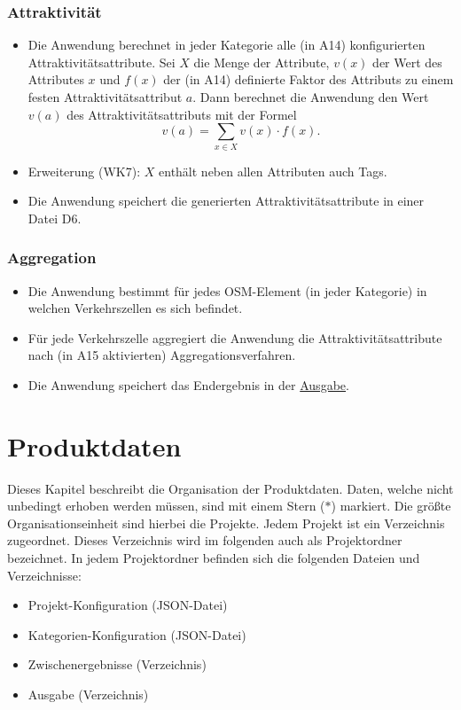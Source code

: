 \documentclass[parskip=full]{scrartcl} %
\begin{document}
\subsubsection*{Attraktivität}
\begin{itemize}
    \item Die Anwendung berechnet in jeder Kategorie alle (in A14) konfigurierten Attraktivitätsattribute. Sei $X$ die Menge der Attribute, $v(x)$ der Wert des Attributes $x$ und $f(x)$ der (in A14) definierte Faktor des Attributs zu einem festen Attraktivitätsattribut $a$. Dann berechnet die Anwendung den Wert $v(a)$ des Attraktivitätsattributs mit der Formel $$v(a)=\sum_{x\in X}{v(x)\cdot f(x)}.$$
    \item Erweiterung (WK7): $X$ enthält neben allen Attributen auch Tags.
    \item Die Anwendung speichert die generierten Attraktivitätsattribute in einer Datei D6.
\end{itemize}

\subsubsection*{Aggregation}
\begin{itemize}
    \item Die Anwendung bestimmt für jedes OSM-Element (in jeder Kategorie) in welchen Verkehrszellen es sich befindet.
    \item Für jede Verkehrszelle aggregiert die Anwendung die Attraktivitätsattribute nach (in A15 aktivierten) Aggregationsverfahren.
    \item Die Anwendung speichert das Endergebnis in der \hyperlink{finalresult}{Ausgabe}.
\end{itemize}
\newpage





\section{Produktdaten} \hypertarget{data}{}
Dieses Kapitel beschreibt die Organisation der Produktdaten. Daten, welche nicht unbedingt erhoben werden müssen, sind mit einem Stern ($\ast$) markiert. Die größte Organisationseinheit sind hierbei die Projekte. Jedem Projekt ist ein Verzeichnis zugeordnet. Dieses Verzeichnis wird im folgenden auch als Projektordner bezeichnet. In jedem Projektordner befinden sich die folgenden Dateien und Verzeichnisse:
\begin{itemize}
    \item Projekt-Konfiguration (JSON-Datei)
    \item Kategorien-Konfiguration (JSON-Datei)
    \item Zwischenergebnisse (Verzeichnis)
    \item Ausgabe (Verzeichnis)
\end{itemize}
\end{document}
